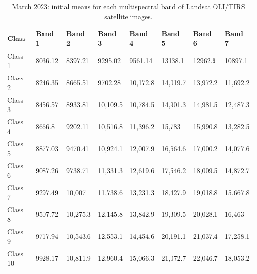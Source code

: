 \documentclass[geomatics,article,accept,pdftex,oneauthor]{Definitions/mdpi}
\begin{document}
\vspace{-6pt}
\begin{table}[H]
\caption{March 2023: initial means for each multispectral band of Landsat OLI/TIRS satellite images.}\label{tabA02}
\begin{tabularx}{\textwidth}{ p{1.5cm}  X  X  X  X  X  X  X  }
\toprule \textbf{Class} & \textbf{Band 1} & \textbf{Band 2} & \textbf{Band 3} & \textbf{Band 4} & \textbf{Band 5} & \textbf{Band 6} & \textbf{Band 7} \\  \midrule
    Class 1 & 8036.12 & 8397.21 & 9295.02 & 9561.14 & 13138.1 & 12962.9 & 10897.1 \\
    Class 2 & 8246.35 & 8665.51 & 9702.28 & 10,172.8 & 14,019.7 & 13,972.2 & 11,692.2 \\
    Class 3 & 8456.57 & 8933.81 & 10,109.5 & 10,784.5 & 14,901.3 & 14,981.5 & 12,487.3 \\
    Class 4 & 8666.8 & 9202.11 & 10,516.8 & 11,396.2 & 15,783 & 15,990.8 & 13,282.5 \\
    Class 5 & 8877.03 & 9470.41 & 10,924.1 & 12,007.9 & 16,664.6 & 17,000.2 & 14,077.6 \\
    Class 6 & 9087.26 & 9738.71 & 11,331.3 & 12,619.6 & 17,546.2 & 18,009.5 & 14,872.7 \\
    Class 7 & 9297.49 & 10,007 & 11,738.6 & 13,231.3 & 18,427.9 & 19,018.8 & 15,667.8 \\
    Class 8 & 9507.72 & 10,275.3 & 12,145.8 & 13,842.9 & 19,309.5 & 20,028.1 & 16,463 \\
    Class 9 & 9717.94 & 10,543.6 & 12,553.1 & 14,454.6 & 20,191.1 & 21,037.4 & 17,258.1 \\
    Class 10 & 9928.17 & 10,811.9 & 12,960.4 & 15,066.3 & 21,072.7 & 22,046.7 & 18,053.2 \\
    \bottomrule
\end{tabularx}
\label{tabA02}
\end{table}
\end{document}
